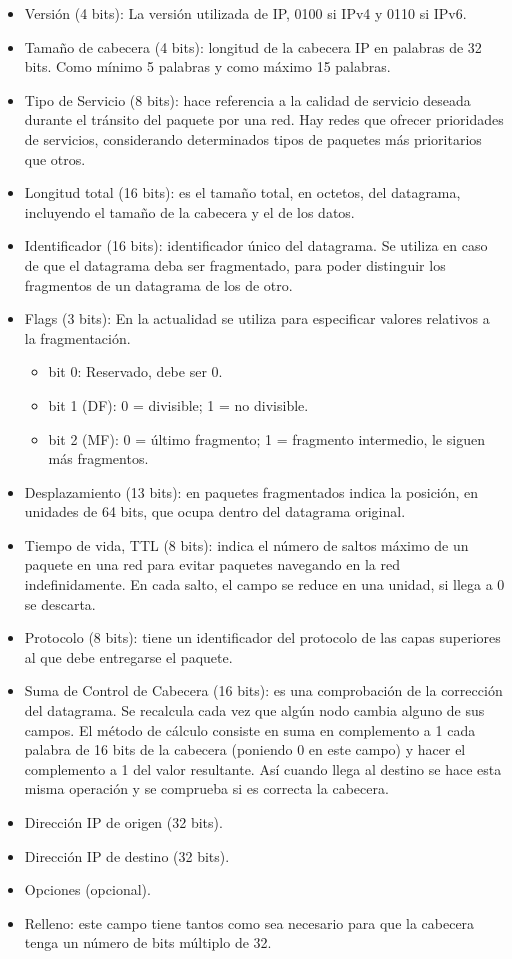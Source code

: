 \begin{itemize}
    \item Versión (4 bits): La versión utilizada de IP, 0100 si IPv4 y 0110 si IPv6. 
    \item Tamaño de cabecera (4 bits): longitud de la cabecera IP en palabras de 32 bits. Como mínimo 5 palabras y como máximo 15 palabras.
    \item Tipo de Servicio (8 bits): hace referencia a la calidad de servicio deseada durante el tránsito del paquete por una red. Hay redes que ofrecer prioridades de servicios, considerando determinados tipos de paquetes más prioritarios que otros.
    \item Longitud total (16 bits): es el tamaño total, en octetos, del datagrama, incluyendo el tamaño de la cabecera y el de los datos.
    \item Identificador (16 bits): identificador único del datagrama. Se utiliza en caso de que el datagrama deba ser fragmentado, para poder distinguir los fragmentos de un datagrama de los de otro.
    \item Flags (3 bits): En la actualidad se utiliza para especificar valores relativos a la fragmentación.
        \begin{itemize}
            \item bit 0: Reservado, debe ser 0.
            \item bit 1 (DF): 0 = divisible; 1 = no divisible.
            \item bit 2 (MF): 0 = último fragmento; 1 = fragmento intermedio, le siguen más fragmentos. 
        \end{itemize}
    \item Desplazamiento (13 bits): en paquetes fragmentados indica la posición, en unidades de 64 bits, que ocupa dentro del datagrama original. 
    \item Tiempo de vida, TTL (8 bits): indica el número de saltos máximo de un paquete en una red para evitar paquetes navegando en la red indefinidamente. En cada salto, el campo se reduce en una unidad, si llega a 0 se descarta.
    \item Protocolo (8 bits): tiene un identificador del protocolo de las capas superiores al que debe entregarse el paquete.
    \item Suma de Control de Cabecera (16 bits): es una comprobación de la corrección del datagrama. Se recalcula cada vez que algún nodo cambia alguno de sus campos. El método de cálculo consiste en suma en complemento a 1 cada palabra de 16 bits de la cabecera (poniendo 0 en este campo) y hacer el complemento a 1 del valor resultante. Así cuando llega al destino se hace esta misma operación y se comprueba si es correcta la cabecera.
    \item Dirección IP de origen (32 bits).
    \item Dirección IP de destino (32 bits).
    \item Opciones (opcional).
    \item Relleno: este campo tiene tantos como sea necesario para que la cabecera tenga un número de bits múltiplo de 32. 
\end{itemize}

